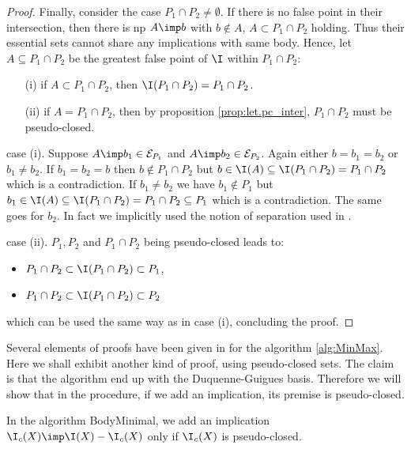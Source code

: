 \begin{proof}
Finally, consider the case $P_1 \cap P_2 \neq \emptyset$. If there is no false
point in their intersection, then there is np $A \imp b$ with $b \notin A$,
$A \subset P_1 \cap P_2$ holding. Thus their essential sets cannot share any
implications with same body. Hence, let $A \subseteq P_1 \cap P_2$ be the 
greatest false point of $\I$ within $P_1 \cap P_2$:
\begin{itemize}
	\item[(i)] if $A \subset P_1 \cap P_2$, then $\I(P_1 \cap P_2) = P_1 \cap 
	P_2$.
	\item[(ii)] if $A = P_1 \cap P_2$, then by proposition 
	\ref{prop:let.pc_inter}, $P_1 \cap P_2$ must be	pseudo-closed. 
\end{itemize}
\noindent case (i). Suppose $A \imp b_1 \in \mathcal{E}_{P_1}$ and $A \imp b_2
\in \mathcal{E}_{P_2}$. Again either $b = b_1 = b_2$ or $b_1 \neq b_2$. If $b_1 
= b_2 = b$ then $b \notin P_1 \cap P_2$ but $b \in \I(A) \subseteq \I(P_1 \cap 
P_2) = P_1 \cap P_2$ which is a contradiction. If $b_1 \neq b_2$ we have $b_1 
\notin P_1$ but $b_1 \in \I(A) \subseteq \I(P_1 \cap P_2) = P_1 \cap P_2 
\subseteq P_1$ which is a contradiction. The same goes for $b_2$. In fact we 
implicitly used the notion of separation used in \cite{berczi_directed_2017}.

case (ii). $P_1, P_2$ and $P_1 \cap P_2$ being pseudo-closed leads to:
\begin{itemize}
	\item $P_1 \cap P_2 \subset \I(P_1 \cap P_2) \subset P_1$,
	\item $P_1 \cap P_2 \subset \I(P_1 \cap P_2) \subset P_2$
\end{itemize}
\noindent which can be used the same way as in case (i), concluding the proof.

\end{proof}

Several elements of proofs have been given in \cite{berczi_directed_2017} for
the algorithm \ref{alg:MinMax}. Here we shall exhibit another kind of proof, 
using pseudo-closed sets. The claim is that the algorithm end up with the 
Duquenne-Guigues basis. Therefore we will show that in the procedure, if we
add an implication, its premise is pseudo-closed.

\begin{proposition} \label{prop:let.algo_min}
In the algorithm BodyMinimal, we add an implication 
$\I_c(X) \imp \I(X) - \I_c(X)$ only if $\I_c(X)$ is pseudo-closed.
	
\end{proposition}

